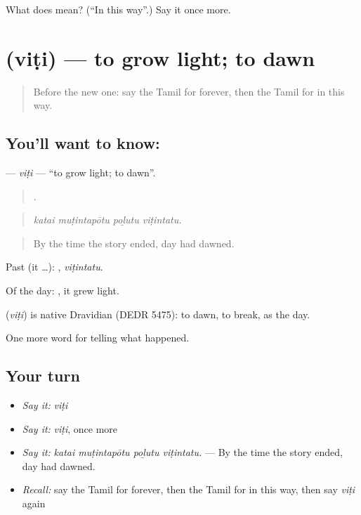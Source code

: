 \begin{tcolorbox}[breakable,colback=teal!4,colframe=teal!35!black,title={Before you move on}]
What does  mean? (\textquotedblleft{}In this way\textquotedblright{}.) Say it once more.
\end{tcolorbox}
\section[\texorpdfstring{\ta{விடி} (viṭi)}{விடி (viṭi)}]{ (viṭi) — to grow light; to dawn}

\label{lesson:TA-C346-viti-dawn}



\begin{quote}
Before the new one: say the Tamil for forever, then the Tamil for in this way.
\end{quote}

\subsection*{You'll want to know: }
\textbf{} — \emph{viṭi} — \textquotedblleft{}to grow light; to dawn\textquotedblright{}.

\begin{quote}
   .
\end{quote}

\begin{quote}
\emph{katai muṭintapōtu poḻutu viṭintatu.}
\end{quote}

\begin{quote}
By the time the story ended, day had dawned.
\end{quote}

Past (it …): , \emph{viṭintatu}.

Of the day:  , it grew light.

\begin{cousinweb}
\textbf{} (\emph{viṭi}) is native Dravidian (DEDR 5475): to dawn, to break, as the day.
\end{cousinweb}

\begin{grammarlens}[title={What you've built}]
One more word for telling what happened.
\end{grammarlens}

\subsection*{Your turn}
\begin{itemize}
\raggedright
  \item \emph{Say it:} \emph{viṭi}
  \item \emph{Say it:} \emph{viṭi}, once more
  \item \emph{Say it:} \emph{katai muṭintapōtu poḻutu viṭintatu.} — By the time the story ended, day had dawned.
  \item \emph{Recall:} say the Tamil for forever, then the Tamil for in this way, then say \emph{viṭi} again
\end{itemize}

